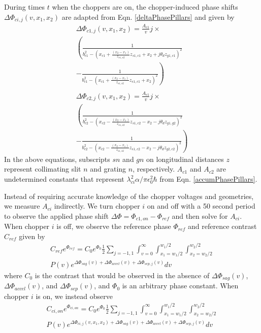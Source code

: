 \documentclass[twocolumn,prl,showpacs,superscriptaddress]{revtex4-1}   %
\newcommand{\eqnref}[1]{Eqn. \eqref{#1}}
\begin{document}
During times $t$ when the choppers are on, the chopper-induced phase shifts $\Delta\Phi_{ci,j}(v,x_1,x_2)$ are adapted from \eqnref{deltaPhasePillars} and given by
\begin{align}
	\Delta\Phi_{c1,j}(v,x_1,x_2) = \frac{A_{c1}}{v}j \times \nonumber \\
	\left(
		\frac{1}{b_{c1}^2 -
			(x_{c1} + \frac{(x_2-x_1)}{z_{s1,s2}}z_{s1,c1} + x_2 + j\theta_d z_{g1,c1})^2
		}
		\right. \nonumber \\ - \left.
		\frac{1}{b_{c1}^2 -
			(x_{c1} + \frac{(x_2-x_1)}{z_{s1,s2}}z_{s1,c1} + x_2)^2
		}
	\right)
	\nonumber \\ 
	\nonumber \\	
	\Delta\Phi_{c2,j}(v,x_1,x_2) = \frac{A_{c1}}{v}j \times \nonumber \\
	\left(
		\frac{1}{b_{c2}^2 -
			(x_{c2} - \frac{(x_2-x_1)}{z_{s1,s2}}z_{s1,c2} - x_2 - j\theta_d z_{g1,g2})^2
		}
		\right. \nonumber \\ - \left.
		\frac{1}{b_{c2}^2 -
			(x_{c2} - \frac{(x_2-x_1)}{z_{s1,s2}}z_{s1,c2} - x_2 - j\theta_d z_{g2,c2})^2
		}
	\right)
	\label{phic1c2}
\end{align}
In the above equations, subscripts $sn$ and $gn$ on longitudinal distances $z$ represent collimating slit $n$ and grating $n$, respectively. $A_{c1}$ and $A_{c2}$ are undetermined constants that represent $\lambda_{ci}^2 \alpha / \pi \epsilon_0^2 \hbar$ from \eqnref{accumPhasePillars}. 

Instead of requiring accurate knowledge of the chopper voltages and geometries, we measure $A_{ci}$ indirectly. We turn chopper $i$ on and off with a 50 second period to observe the applied phase shift $\Delta\Phi = \Phi_{c1,on} - \Phi_{ref}$ and then solve for $A_{ci}$. When chopper $i$ is off, we observe the reference phase $\Phi_{ref}$ and reference contrast $C_{ref}$ given by 
\begin{align}
	C_{ref}e^{\Phi_{ref}} = 
		C_0e^{\Phi_0} \frac{1}{2} \sum_{j=-1,1}
		\int_{v=0}^{\infty}
		\int_{x_1=w_1/2}^{w_1/2}
		\int_{x_2=w_2/2}^{w_2/2} 
		\nonumber \\
		P(v) e^{\Delta\Phi_{sag}(v) + \Delta\Phi_{accel}(v) + \Delta\Phi_{sep,j}(v)} 
		dv
	\label{CPChoppersRef}
\end{align}
where $C_0$ is the contrast that would be observed in the absence of $\Delta\Phi_{sag}(v)$, $\Delta\Phi_{accel}(v)$, and $\Delta\Phi_{sep}(v)$, and $\Phi_0$ is an arbitrary phase constant. When chopper $i$ is on, we instead observe
\begin{align}
	C_{ci,on}e^{\Phi_{ci,on}} = 
		C_0e^{\Phi_0} \frac{1}{2} \sum_{j=-1,1}
		\int_{v=0}^{\infty}
		\int_{x_1=w_1/2}^{w_1/2}
		\int_{x_2=w_2/2}^{w_2/2} 
		\nonumber \\
		P(v) e^{\Delta\Phi_{ci,j}(v,x_1,x_2) + \Delta\Phi_{sag}(v) + \Delta\Phi_{accel}(v) + \Delta\Phi_{sep,j}(v)} 
		dv
	\label{CPChoppersOn}
\end{align}
\end{document}
